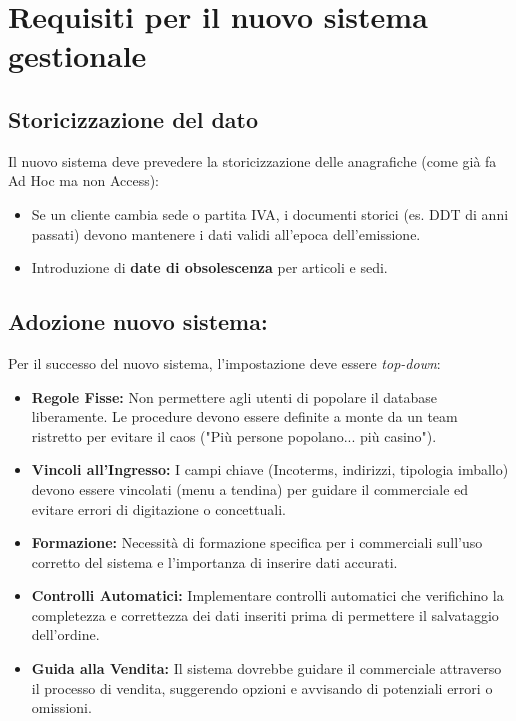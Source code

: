 \documentclass[12pt, a4paper]{article} %
\begin{document}
\section{Requisiti per il nuovo sistema gestionale}

\subsection{Storicizzazione del dato}
Il nuovo sistema deve prevedere la storicizzazione delle anagrafiche (come già
fa Ad Hoc ma non Access):
\begin{itemize}
    \item Se un cliente cambia sede o partita IVA, i documenti storici (es. DDT di anni
          passati) devono mantenere i dati validi all'epoca dell'emissione.
    \item Introduzione di \textbf{date di obsolescenza} per articoli e sedi.
\end{itemize}

\subsection{Adozione nuovo sistema:}
Per il successo del nuovo sistema, l'impostazione deve essere
\textit{top-down}:
\begin{itemize}
    \item \textbf{Regole Fisse:} Non permettere agli utenti di popolare il database liberamente. Le procedure devono essere definite a monte da un team ristretto per evitare il caos ("Più persone popolano... più casino").
    \item \textbf{Vincoli all'Ingresso:} I campi chiave (Incoterms, indirizzi, tipologia imballo) devono essere vincolati (menu a tendina) per guidare il commerciale ed evitare errori di digitazione o concettuali.
    \item \textbf{Formazione:} Necessità di formazione specifica per i commerciali sull'uso corretto del sistema e l'importanza di inserire dati accurati.
    \item \textbf{Controlli Automatici:} Implementare controlli automatici che verifichino la completezza e correttezza dei dati inseriti prima di permettere il salvataggio dell'ordine.
    \item \textbf{Guida alla Vendita:} Il sistema dovrebbe guidare il commerciale attraverso il processo di vendita, suggerendo opzioni e avvisando di potenziali errori o omissioni.
\end{itemize}
\end{document}
